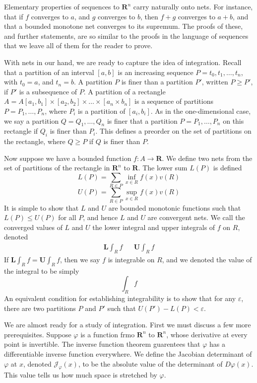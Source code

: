 Elementary properties of sequences to $\mathbf{R}^n$ carry naturally onto nets. For instance, that if $f$ converges to $a$, and $g$ converges to $b$, then $f + g$ converges to $a + b$, and that a bounded monotone net converges to its supremum. The proofs of these, and further statements, are so similar to the proofs in the language of sequences that we leave all of them for the reader to prove.

With nets in our hand, we are ready to capture the idea of integration. Recall that a partition of an interval $[a,b]$ is an increasing sequence $P = t_0, t_1, \dots, t_n$, with $t_0 = a$, and $t_n = b$. A partition $P$ is finer than a partition $P'$, written $P \geq P'$, if $P'$ is a subsequence of $P$. A partition of a rectangle $A = A[a_1, b_1] \times [a_2, b_2] \times \dots \times [a_n \times b_n]$ is a sequence of partitions $P = P_1, \dots, P_n$, where $P_i$ is a partition of $[a_i, b_i]$. As in the one-dimensional case, we say a partition $Q = Q_1, \dots, Q_n$ is finer that a partition $P = P_1, \dots, P_n$ on this rectangle if $Q_i$ is finer than $P_i$. This defines a preorder on the set of partitions on the rectangle, where $Q \geq P$ if $Q$ is finer than $P$.

Now suppose we have a bounded function $f:A \to \mathbf{R}$. We define two nets from the set of partitions of the rectangle in $\mathbf{R}^n$ to $\mathbf{R}$. The lower sum $L(P)$ is defined
%
\[ L(P) = \sum_{R \in P} \inf_{x \in R} f(x) v(R) \]
%
\[ U(P) = \sum_{R \in P} \sup_{x \in R} f(x) v(R) \]
%
It is simple to show that $L$ and $U$ are bounded monotonic functions such that $L(P) \leq U(P)$ for all $P$, and hence $L$ and $U$ are convergent nets. We call the converged values of $L$ and $U$ the lower integral and upper integrals of $f$ on $R$, denoted
%
\begin{align*}
    \mathbf{L} \int_R f && \mathbf{U} \int_R f
\end{align*}
%
If $\mathbf{L} \int_R f = \mathbf{U} \int_R f$, then we say $f$ is integrable on $R$, and we denoted the value of the integral to be simply
%
\[ \int_R f \]
%
An equivalent condition for establishing integrability is to show that for any $\varepsilon$, there are two partitions $P$ and $P'$ such that $U(P') - L(P) < \varepsilon$.

We are almost ready for a study of integration. First we must discuss a few more prerequisites. Suppose $\varphi$ is a function frmo $\mathbf{R}^n$ to $\mathbf{R}^n$, whose derivative at every point is invertible. The inverse function theorem guarentees that $\varphi$ has a differentiable inverse function everywhere. We define the Jacobian determinant of $\varphi$ at $x$, denoted $\mathcal{J}_\varphi(x)$, to be the absolute value of the determinant of $D\varphi(x)$. This value tells us how much space is stretched by $\varphi$.

